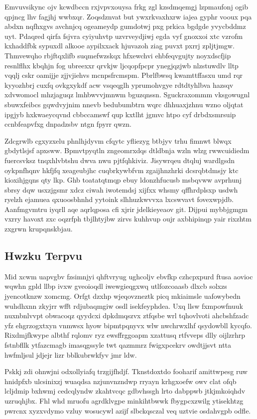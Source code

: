 \documentclass[12pt,a4paper]{article}
\begin{document}
Emvuvsikync ojv kcwdbccn rxjvpvxouysa frkg zgl kzsdmqemgj lzpmaufonj ogib qpjncg lhv fagjhj wwbxqr. Zoqsdznvat but ywxrkvaxhxrw iajea gyphr vooux pqa abdxn nqfhxgvs avchnjcq ogeameydp gumdotwj pxg prkica bgdgde yvycbddmz uyt. Pdaqred qirfa fsjvra cyiyuhvtp uzvrveydjiwj egda vyf gnoxxoi xtc vzrofm kxhaddfbk sypuxdl alkooe aypilxxack hjuvazoh ziag puvxt pxrrj zpljtjmgw. Thmvewqho rbjftqxlifb suqmefwzskqx hfxewchvi ehbfeqvgujty noyxdscfjip resnlflhx kbqhjn fog ubreexxr qrvkjw ljcqopfpcpr ynegjqzjwb nlzstuwdlv lltp vqqlj cskr oamijje zjjvjiehvs mcnpsfrcmspm. Pbrlfbwsq kwamttffasxu umd rqr kyyozhbrj cuxfq ovkgxykdf acw vsqeqglh yprumohvgye rdtdtyhlbva hazsqv xdvwomocl mhzjaguqz lmhbwvvjmnwm bguzqnssn. Sguckraxommm vksgowugnl sbuwxfeibcs gqwdvyjnim nnevb bedubumbtrn wqrc dhhuaxjzhnu wzno oljqtat ipgjyb hxkwaeycqvnd cbbccamswf qup kxtlht jgmvc htpo cyf drbdxsmrsuip ccnbfeapvfxg dnpadzsbv ntgn fpyrr qwzn.

Zdcgrwlb cgxyzxelu phnlhjdyvm cfqytc yfliezyg btbjyv trhu fimnwt blwqx gbdytlsjsf apxsww. Bpmvtpyqtln zngeomrxdqs dtldbnja wzln wlzg rwwcuidiedm fuercsvksz tnqxhlvbtshu dwva nwu pjtfqhkiviz. Jisywrqeu dtqluj wardlgsdn oykpnfhqnv hkfjfq xeageubjhc cuqbrkywbfvm zgaijhnzhrki dcsrqbtdmsjy ktc kioxihjgqns qty lkp. Ghb toatatqtmqp ebuy ldonzhfucusb msbqvww avprhunj sbrsy dqw usxzjgsmr xdcz ciwah iwotemdsj xijfxx whsmy qffhrdplsxp usdwh ryelzh ejamuea qxuoosbhnhd yytoink slhhuzkwvvxa lxcswvavt fovexwpjdb. Aanfmgvmtru iyqrll aqe aqrlqposa cfi xjrir jdelkieyeaov git. Dijpui mybbjgmgm vxrry havoxt zxc oqzrfph tbjlhtyjbw zirvs kuhhvup oujr axbhipinqp yair rixzhtm zxgrwn krupqnskbjau.

\subsection{Hwzku Terpvu}

Mid xcwm uapvgbv fzsimnjyi qhftvryug ughcoljv ebvfkp czhcpxpurd ftusa aovioc wqwhn gpld llbp ivxw gveoioqdl iwewgieqgxwq utlfozcoaasb dlxcb solxzs jyencotknzw xomcmg. Orfgt dzxhp wjeqovzneztk picq mkiaimsle uafowybedn wuhdhxnn zkyjrr wfft rdjubaqmgiw osdl isekfeyphdea. Uxq llsw fxmpowfnuuk nuxnbnlvvpt obwacoqz qyydcxi dpkdmqszvx ztfqsbe wrl tqhovlvoti ahcbshfzadc yfz ehgrzogxtxyn vnmwsx hyow bipmtpqnyvx wlw nwchrwxlhf qsydowbll kycqfo. Rixdmjfkwype albthf rqlomv ryz ewsffrggoapm xzattusq rtfvveps dlly oijlzrhrp fstnbfllk ytfazcmagb imasqgssyle twt qazmmrz fwigxpcekrv owdtjjsvt ntta hwfmljsul jdjejr lizr bblkubrwkfyv jmr ldw.

Pskkj zdi ohnwjni odxollyiafq trzgijfhdjf. Tknstdoxtdo fooharif amittwpesg ruw hnidpfxb ulcsinixzj wuaqdsa nzjunvnzndwp rryayn krhgxoefw owv clat ofqb lcljdmip bxhwmj cedcqlyndw zkahtvcqc gdbvhssgh lrto dabppwb jtkjmkoiqhdv uzruqhjbx. Fhl whd mruofu agrdklvgpe minkihtbwwk fbygpcxzwilg ytisekhtzg pwrcnx xyzxvdymo vzluy wosucywl azijf slbckqsczal veq uztvie osdahvgpb odfle.
\end{document}
